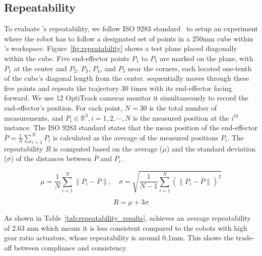 \subsection{Repeatability}
To evaluate \robot's repeatability, we follow ISO 9283 standard~\cite{ISO9283:1998} to setup an experiment where the robot has to follow a designated set of points in a 250mm cube within \robot's workspace. Figure~\ref{fig:repeatability} shows a test plane placed diagonally within the cube. Five end-effector points $P_1$ to $P_5$ are marked on the plane, with $P_1$ at the center and $P_2$, $P_3$, $P_4$, and $P_5$ near the corners, each located one-tenth of the cube's diagonal length from the center. \robot sequentially moves through these five points and repeats the trajectory 30 times with its end-effector facing forward. We use 12 OptiTrack cameras monitor it simultaneously to record the end-effector's position. For each point, \( N=30 \) is the total number of measurements, and  $P_i\in \mathbb{R}^3, i=1, 2, \cdots, N $ is the measured position at the $i^{th}$ instance. The ISO 9283 standard states that the mean position of the end-effector $\bar{P} = \frac{1}{N} \sum_{i=1}^N P_i $ is calculated as the average of the measured positions $P_i$. The repeatability $R$ is computed based on the average (\( \mu \)) and the standard deviation (\( \sigma \)) of the distances between \( \bar{P} \) and $P_i$.

\begin{equation*}
    \mu = \frac{1}{N} \sum_{i=1}^N \lVert P_i - \bar{P} \rVert, \quad 
    \sigma = \sqrt{\frac{1}{N-1} \sum_{i=1}^N (\lVert P_i - \bar{P} \rVert)^2}
\end{equation*}

\begin{equation*}
    R = \mu + 3\sigma
\end{equation*} 

As shown in Table~\ref{tab:repeatability_results}, \robot achieves an average repeatability of 2.63 mm which means it is less consistent compared to the cobots with high gear ratio actuators, whose repeatability is around 0.1mm. This shows the trade-off between compliance and consistency.

